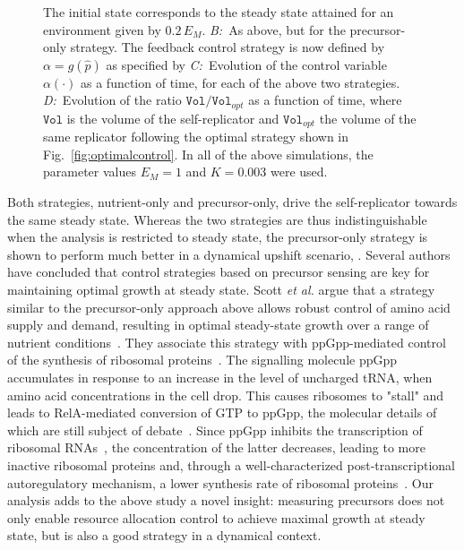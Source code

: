 \begin{figure}
{The initial state corresponds to the steady state attained for an environment given by $0.2 \, E_M$.
\textit{B:}~As above, but for the precursor-only strategy.
The feedback control strategy is now defined by $\alpha = g(\hat{p})$ as specified by 
\textit{C:}~Evolution of the control variable $\alpha(\cdot)$ as a function of time, for each of the above two strategies.
\textit{D:}~Evolution of the ratio $\texttt{Vol} / \texttt{Vol}_{opt}$  as a function of time, where $\texttt{Vol}$ is the volume of the self-replicator and $\texttt{Vol}_{opt}$ the volume of the same replicator following the optimal strategy shown in Fig.~\ref{fig:optimalcontrol}.
In all of the above simulations, the parameter values $E_M=1$ and $K=0.003$ were used.
}
\label{fig:comparison_nutrients_precursor}
\end{figure}

Both strategies, nutrient-only and precursor-only, drive the self-replicator towards the same steady state.
Whereas the two strategies are thus indistinguishable when the analysis is restricted to steady state, the precursor-only strategy is shown to perform much better in a dynamical upshift scenario, .
Several authors have concluded that control strategies based on precursor sensing are key for maintaining optimal growth at steady state.
Scott \textit{et al.} argue that a strategy similar to the precursor-only approach above allows robust control of amino acid supply and demand, resulting in optimal steady-state growth over a range of nutrient conditions~\cite{scott_emergence_2014}.
They associate this strategy with ppGpp-mediated control of the synthesis of ribosomal proteins~\cite{dalebroux_ppgpp_2012,potrykus_pppgpp_2008,hauryliuk_recent_2015}.
The signalling molecule ppGpp accumulates in response to an increase in the level of uncharged tRNA, when amino acid concentrations in the cell drop. 
This causes ribosomes to "stall" and leads to RelA-mediated conversion of GTP to ppGpp, the molecular details of which are still subject of debate~\cite{english_singlemolecule_2011,hauryliuk_recent_2015}.
Since ppGpp inhibits the transcription of ribosomal RNAs~\cite{dennis_control_2004}, the concentration of the latter decreases, leading to more inactive ribosomal proteins and, through a well-characterized post-transcriptional autoregulatory mechanism, a lower synthesis rate of ribosomal proteins~\cite{keener_regulation_1996,potrykus_pppgpp_2008}.
Our analysis adds to the above study a novel insight: measuring precursors does not only enable resource allocation control to achieve maximal growth at steady state, but is also a good strategy in a dynamical context.

